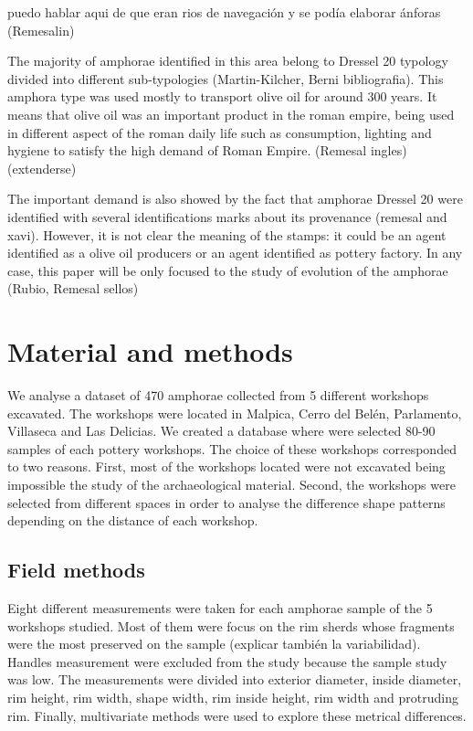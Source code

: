 \documentclass[review, twocolumn]{elsarticle}
\begin{document}
puedo hablar aqui de que eran rios de navegación y se podía elaborar ánforas (Remesalin)


The majority of amphorae identified in this area belong to Dressel 20 typology divided into different sub-typologies (Martin-Kilcher, Berni bibliografia). This amphora type was used mostly to transport olive oil for around 300 years. It means that olive oil was an important product in the roman empire, being used in different aspect of the roman daily life such as consumption, lighting and hygiene to satisfy the high demand of Roman Empire. (Remesal ingles) (extenderse) 

The important demand is also showed by the fact that amphorae Dressel 20 were identified with several identifications marks about its provenance (remesal and xavi). However, it is not clear the meaning of the stamps: it could be an agent identified as a olive oil producers or an agent identified as pottery factory. In any case, this paper will be only focused to the study of evolution of the amphorae (Rubio, Remesal sellos)


\section{Material and methods}

We analyse a dataset of 470 amphorae collected from 5 different workshops excavated. 
The workshops were located in Malpica, Cerro del Belén, Parlamento, Villaseca and Las Delicias. We created a database where were selected 80-90 samples of each pottery workshops. The choice of these workshops corresponded to two reasons. First, most of the workshops located were not excavated being impossible the study of the archaeological material. Second, the workshops were selected from different spaces in order to analyse the difference shape patterns depending on the distance of each workshop. 

\subsection{Field methods}


Eight different measurements were taken for each amphorae sample of the 5 workshops studied. Most of them were focus on the rim sherds whose fragments were the most preserved on the sample (explicar también la variabilidad). Handles measurement were excluded from the study because the sample study was low. The measurements were divided into exterior diameter, inside diameter, rim height, rim width, shape width, rim inside height, rim width and protruding rim. Finally, multivariate methods were used to explore these metrical differences. 
\end{document}
